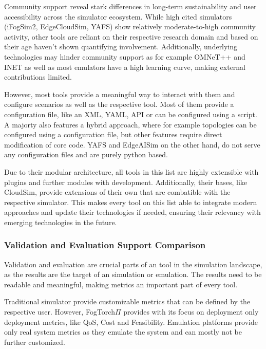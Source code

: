 Community support reveal stark differences in long-term sustainability and user accessibility across the simulator ecosystem.
While high cited simulators (iFogSim2, EdgeCloudSim, YAFS) show relatively moderate-to-high community activity, other tools are reliant on their respective research domain and based on their age haven't shown quantifying involvement.
Additionally, underlying technologies may hinder community support as for example OMNeT++ and INET as well as most emulators have a high learning curve, making external contributions limited.

However, most tools provide a meaningful way to interact with them and configure scenarios as well as the respective tool.
Most of them provide a configuration file, like an XML, YAML, API or can be configured using a script. 
A majorty also features a hybrid approach, where for example topologies can be configured using a configuration file, but other features require direct modification of core code. 
YAFS and EdgeAISim on the other hand, do not serve any configuration files and are purely python based.

Due to their modular architecture, all tools in this list are highly extensible with plugins and further modules with development.
Additionally, their bases, like CloudSim, provide extensions of their own that are combatible with the respective simulator.
This makes every tool on this list able to integrate modern approaches and update their technologies if needed, ensuring their relevancy with emerging technologies in the future.

\subsubsection{Validation and Evaluation Support Comparison}
Validation and evaluation are crucial parts of an tool in the simulation landscape, as the results are the target of an simulation or emulation.
The results need to be readable and meaningful, making metrics an important part of every tool.

Traditional simulator provide customizable metrics that can be defined by the respective user.
However, FogTorch$\Pi$ provides with its focus on deployment only deployment metrics, like QoS, Cost and Feasibility.
Emulation platforms provide only real system metrics as they emulate the system and can mostly not be further customized.

